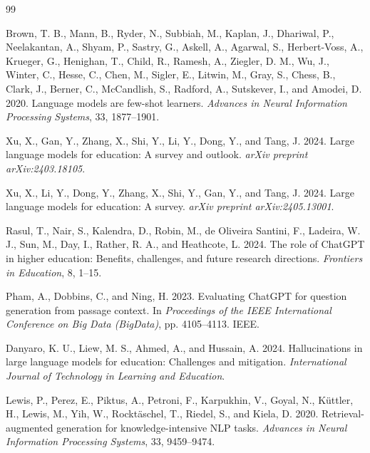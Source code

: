 \documentclass[12pt,a4paper]{article}
\begin{document}

\newpage
{}
\renewcommand{\refname}{LIST OF REFERENCES}

\begin{thebibliography}{99}
\setlength{\itemsep}{0.5\baselineskip}

Brown, T. B., Mann, B., Ryder, N., Subbiah, M., Kaplan, J., Dhariwal, P.,
Neelakantan, A., Shyam, P., Sastry, G., Askell, A., Agarwal, S.,
Herbert-Voss, A., Krueger, G., Henighan, T., Child, R., Ramesh, A.,
Ziegler, D. M., Wu, J., Winter, C., Hesse, C., Chen, M., Sigler, E.,
Litwin, M., Gray, S., Chess, B., Clark, J., Berner, C., McCandlish, S.,
Radford, A., Sutskever, I., and Amodei, D. 2020. Language models are
few-shot learners. \textit{Advances in Neural Information Processing
Systems}, 33, 1877--1901.

Xu, X., Gan, Y., Zhang, X., Shi, Y., Li, Y., Dong, Y., and Tang, J. 2024.
Large language models for education: A survey and outlook.
\textit{arXiv preprint arXiv:2403.18105}.

Xu, X., Li, Y., Dong, Y., Zhang, X., Shi, Y., Gan, Y., and Tang, J. 2024.
Large language models for education: A survey.
\textit{arXiv preprint arXiv:2405.13001}.

Rasul, T., Nair, S., Kalendra, D., Robin, M., de Oliveira Santini, F.,
Ladeira, W. J., Sun, M., Day, I., Rather, R. A., and Heathcote, L. 2024.
The role of ChatGPT in higher education: Benefits, challenges, and future
research directions. \textit{Frontiers in Education}, 8, 1--15.

Pham, A., Dobbins, C., and Ning, H. 2023. Evaluating ChatGPT for question
generation from passage context. In \textit{Proceedings of the IEEE
International Conference on Big Data (BigData)}, pp. 4105--4113. IEEE.

Danyaro, K. U., Liew, M. S., Ahmed, A., and Hussain, A. 2024.
Hallucinations in large language models for education: Challenges and
mitigation. \textit{International Journal of Technology in Learning
and Education}.

Lewis, P., Perez, E., Piktus, A., Petroni, F., Karpukhin, V., Goyal, N.,
K\"{u}ttler, H., Lewis, M., Yih, W., Rockt\"{a}schel, T., Riedel, S., and
Kiela, D. 2020. Retrieval-augmented generation for knowledge-intensive NLP
tasks. \textit{Advances in Neural Information Processing Systems}, 33,
9459--9474.


\end{thebibliography}
\end{document}
